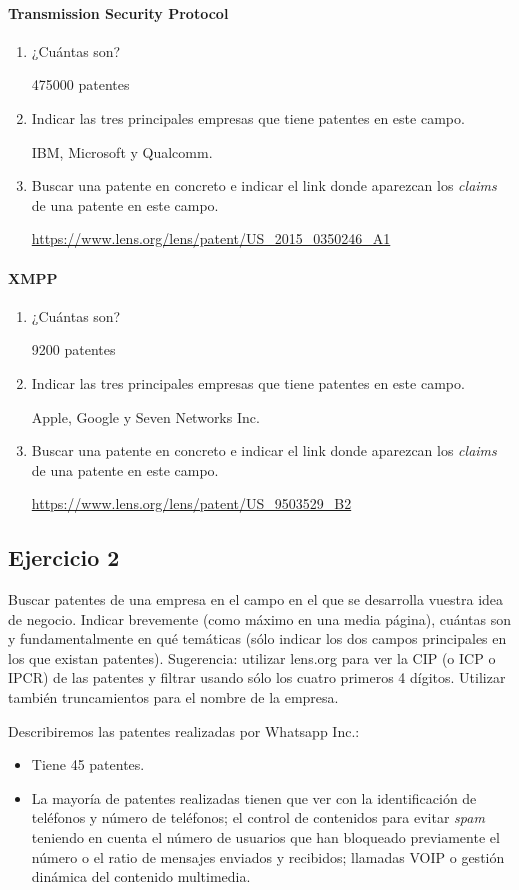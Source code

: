 \documentclass[11pt,leqno]{article}
\begin{document}
\paragraph{Transmission Security Protocol}
\begin{enumerate}[a]
\item ¿Cuántas son? 

	475000 patentes
\item Indicar las tres principales empresas que tiene patentes en este campo.

	IBM, Microsoft y Qualcomm.
\item Buscar una patente en concreto e indicar el link donde aparezcan los 
\textit{claims} de una patente en este campo.

	\url{https://www.lens.org/lens/patent/US_2015_0350246_A1}
\end{enumerate}


\paragraph{XMPP}
\begin{enumerate}[a]
\item ¿Cuántas son? 

	9200 patentes
\item Indicar las tres principales empresas que tiene patentes en este campo.

	Apple, Google y Seven Networks Inc.
\item Buscar una patente en concreto e indicar el link donde aparezcan los 
\textit{claims} de una patente en este campo.

	\url{https://www.lens.org/lens/patent/US_9503529_B2}
\end{enumerate}


\subsection{Ejercicio 2}
Buscar patentes de una empresa en el campo en el que se desarrolla 
vuestra idea de negocio.
Indicar brevemente (como máximo en una media página), cuántas son y 
fundamentalmente en qué temáticas (sólo indicar los dos campos principales en 
los que existan patentes).
Sugerencia: utilizar lens.org para ver la CIP (o ICP o IPCR) de las patentes y 
filtrar usando sólo
los cuatro primeros 4 dígitos. Utilizar también truncamientos para el nombre de 
la empresa.

Describiremos las patentes realizadas por Whatsapp Inc.:
\begin{itemize}
\item Tiene 45 patentes.
\item La mayoría de patentes realizadas tienen que ver con la identificación
de teléfonos y número de teléfonos; el control de contenidos para 
evitar \textit{spam} teniendo en cuenta el número de usuarios que han 
bloqueado previamente el número o el ratio de mensajes enviados y recibidos;
llamadas VOIP o gestión dinámica del contenido multimedia.
\end{itemize}
\end{document}
